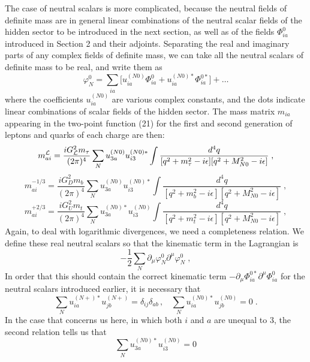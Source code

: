 \documentclass[12pt]{article}
\begin{document}
The case of neutral scalars is more complicated, because the neutral fields  of definite mass are in general linear combinations of the neutral scalar fields of the hidden sector to be introduced in the next section, as well as of the fields $\Phi_{ia}^0$ introduced in Section 2 and their adjoints.  Separating the real and imaginary parts of any complex fields of definite mass, we can take all the neutral scalars of definite mass to be real, and write them as
\begin{equation}
  \varphi_N^0=\sum_{ia}\Big[u_{ia}^{(N0)} \Phi_{ia}^0+u_{ia}^{(N0)*} \Phi_{ia}^{0*}\Big]+\dots
\end{equation}
where the coefficients $u_{ia}^{(N0)}$ are various complex constants, and the dots indicate linear combinations of scalar fields of the hidden sector.
The mass matrix $m_{ia}$ appearing in the two-point function (21) for the first and second generation of leptons and quarks of each charge are then:
\begin{equation}
m^{\cal L}_{ai}=\frac{iG_{\cal L}^2m_\tau}{(2\pi)^4}\sum_{N}  u_{3a}^{(N0)}u_{i3}^{(N0)*} \int \frac{d^4q}{[q^2+m_\tau^2-i\epsilon][q^2+M_{N0}^2-i\epsilon]}\;,
\end{equation}
\begin{equation}
m^{-1/3}_{ai}=\frac{iG^2_Dm_b}{(2\pi)^4}\sum_{N}  u_{3a}^{(N0)}u_{i3}^{(N0)*} \int \frac{d^4q}{[q^2+m_b^2-i\epsilon][q^2+M_{N0}^2-i\epsilon]}\;,
\end{equation}
\begin{equation}
m^{+2/3}_{ai}=\frac{iG^2_Um_t}{(2\pi)^4}\sum_{N}  u_{3a}^{(N0)*}u_{i3}^{(N0)} \int \frac{d^4q}{[q^2+m_t^2-i\epsilon][q^2+M_{N0}^2-i\epsilon]}\;,
\end{equation}
Again, to deal with logarithmic divergences, we need a completeness relation.
We define these real neutral scalars so that the kinematic term
 in the Lagrangian is   
$$-\frac{1}{2}\sum_N\partial_\mu\varphi^{0}_N\partial^\mu\varphi^0_N\;,$$
In order that this should contain the correct kinematic term $-\partial_\mu\Phi_{ia}^{0*}\partial^\mu\Phi_{ia}^{0}$ for the neutral scalars introduced earlier, it is necessary that 
\begin{equation}
\sum_{N}  u_{ia}^{(N+)*}u_{jb}^{(N+)}=\delta_{ij}\delta_{ab}\,,~~~~
\sum_{N}  u_{ia}^{(N0)*}u_{jb}^{(N0)}=0
\;.
\end{equation}
In the case that concerns us here, in which both $i$ and $a$ are unequal to 3, the second relation tells us that
\begin{equation}
\sum_{N}  u_{3a}^{(N0)*}u_{i3}^{(N0)}=0
\end{equation}
\end{document}
